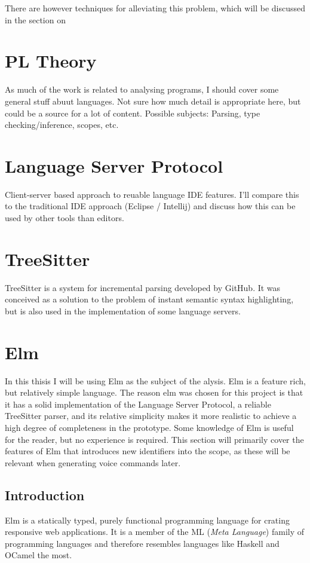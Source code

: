 \documentclass[../thesis.tex]{subfiles}
\begin{document}
There are however techniques for alleviating this problem, which will be discussed in the section on~



\section{PL Theory}
As much of the work is related to analysing programs, I should cover some general stuff abuut languages.
Not sure how much detail is appropriate here, but could be a source for a lot of content.
Possible subjects: Parsing, type checking/inference, scopes, etc.

\section{Language Server Protocol}
Client-server based approach to reuable language IDE features.
I'll compare this to the traditional IDE approach (Eclipse / Intellij)
and discuss how this can be used by other tools than editors.

\section{TreeSitter}
TreeSitter is a system for incremental parsing developed by GitHub.
It was conceived as a solution to the problem of instant semantic syntax highlighting,
but is also used in the implementation of some language servers.

\section{Elm}\label{sec:elm}
In this thisis I will be using Elm as the subject of the alysis.
Elm is a feature rich, but relatively simple language.
The reason elm was chosen for this project is that it has a solid implementation of
the Language Server Protocol, a reliable TreeSitter parser, and its relative simplicity
makes it more realistic to achieve a high degree of completeness in the prototype.
Some knowledge of Elm is useful for the reader, but no experience is required.
This section will primarily cover the features of Elm that introduces new identifiers into the scope,
as these will be relevant when generating voice commands later.

\subsection{Introduction}
Elm is a statically typed, purely functional programming language for crating responsive web applications.
It is a member of the ML (\textit{Meta Language}) family of programming languages
and therefore resembles languages like Haskell and OCamel the most.
\end{document}
